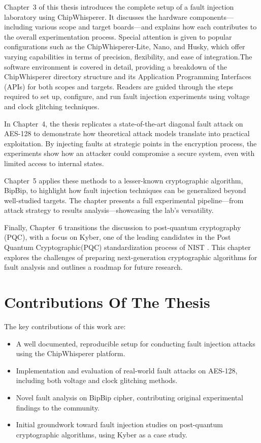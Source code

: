 Chapter~3 of this thesis introduces the complete setup of a fault injection laboratory using ChipWhisperer. It discusses the hardware components—including various scope and target boards—and explains how each contributes to the overall experimentation process. Special attention is given to popular configurations such as the ChipWhisperer-Lite, Nano, and Husky, which offer varying capabilities in terms of precision, flexibility, and ease of integration.The software environment is covered in detail, providing a breakdown of the ChipWhisperer directory structure and its Application Programming Interfaces (APIs) for both scopes and targets. Readers are guided through the steps required to set up, configure, and run fault injection experiments using voltage and clock glitching techniques.

In Chapter~4, the thesis replicates a state-of-the-art diagonal fault attack on AES-128 to demonstrate how theoretical attack models translate into practical exploitation. By injecting faults at strategic points in the encryption process, the experiments show how an attacker could compromise a secure system, even with limited access to internal states.

Chapter~5 applies these methods to a lesser-known cryptographic algorithm, BipBip, to highlight how fault injection techniques can be generalized beyond well-studied targets. The chapter presents a full experimental pipeline—from attack strategy to results analysis—showcasing the lab’s versatility.

Finally, Chapter~6 transitions the discussion to post-quantum cryptography (PQC), with a focus on Kyber, one of the leading candidates in the Post Quantum Cryptographic(PQC) standardization process of NIST . This chapter explores the challenges of preparing next-generation cryptographic algorithms for fault analysis and outlines a roadmap for future research.

\section{Contributions Of The Thesis}

The key contributions of this work are:
\begin{itemize}
    \item A well documented, reproducible setup for conducting fault injection attacks using the ChipWhisperer platform.
    \item Implementation and evaluation of real-world fault attacks on AES-128, including both voltage and clock glitching methods.
    \item Novel fault analysis on BipBip cipher, contributing original experimental findings to the community.
    \item Initial groundwork toward fault injection studies on post-quantum cryptographic algorithms, using Kyber as a case study.
\end{itemize}


